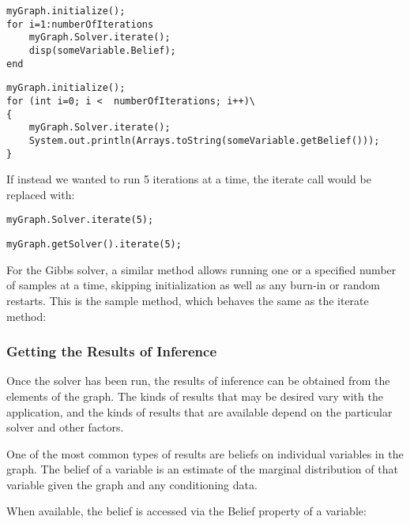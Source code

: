\ifmatlab

\begin{lstlisting}
myGraph.initialize();
for i=1:numberOfIterations
	myGraph.Solver.iterate();
	disp(someVariable.Belief);
end
\end{lstlisting}

\fi

\ifjava

\begin{lstlisting}
myGraph.initialize();
for (int i=0; i <  numberOfIterations; i++)\
{
	myGraph.Solver.iterate();
	System.out.println(Arrays.toString(someVariable.getBelief()));
}
\end{lstlisting}

\fi

If instead we wanted to run 5 iterations at a time, the iterate call would be replaced with:

\ifmatlab

\begin{lstlisting}
myGraph.Solver.iterate(5);
\end{lstlisting}

\fi

\ifjava
\begin{lstlisting}
myGraph.getSolver().iterate(5);
\end{lstlisting}

\fi

For the Gibbs solver, a similar method allows running one or a specified number of samples at a time, skipping initialization as well as any burn-in or random restarts.  This is the sample method, which behaves the same as the iterate method:


\subsubsection{Getting the Results of Inference}

Once the solver has been run, the results of inference can be obtained from the elements of the graph.  The kinds of results that may be desired vary with the application, and the kinds of results that are available depend on the particular solver and other factors.

One of the most common types of results are beliefs on individual variables in the graph.  The belief of a variable is an estimate of the marginal distribution of that variable given the graph and any conditioning data.  

\ifmatlab

When available, the belief is accessed via the Belief property of a variable:

